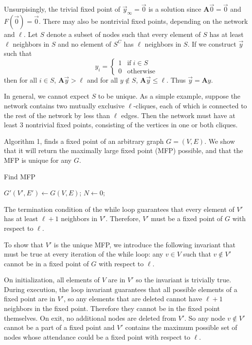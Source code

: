 \documentclass[12pt]{article}
\begin{document}
Unsurpisingly, the trivial fixed point of $\vec{y}_{\infty} = \vec{0}$ is a solution since $\mathbf{A}\vec{0} = \vec{0}$ and $F(\vec{0}) = \vec{0}$.  There may also be nontrivial fixed points, depending on the network and $\ell$.  Let $S$ denote a subset of nodes such that every element of $S$ has at least $\ell$ neighbors in $S$ and no element of $S^C$ has $\ell$ neighbors in $S$.  If we construct $\vec{y}$ such that  
\begin{equation}
  y_i = \begin{cases}
    1 &\text{if} \; i \in S \\
    0 &\text{otherwise}
  \end{cases}
\end{equation}
 then for all $i \in S$, $\mathbf{A}\vec{y} > \ell$ and for all $y \notin S$, $\mathbf{A}\vec{y} \leq \ell$.  Thus $\vec{y} = \mathbf{A}y$. 

In general, we cannot expect $S$ to be unique.  As a simple example, suppose the network contains two mutually exclusive $\ell$-cliques, each of which is connected to the rest of the network by less than $\ell$ edges.  Then the network must have at least 3 nontrivial fixed points, consisting of the vertices in one or both cliques.

Algorithm 1, finds a fixed point of an arbitrary graph $G=(V,E)$.  We show that it will return the maximally large fixed point (MFP) possible, and that the MFP is unique for any $G$.

\begin{algorithm}
  \caption{Find MFP}\label{alg:two}
  $G'(V', E') \gets G(V, E)$;
  $N \gets 0$;
  \end{algorithm}

  The termination condition of the while loop guarantees that every element of $V'$ has at least $\ell + 1$ neighbors in $V'$.  Therefore, $V'$ must be a fixed point of $G$ with respect to $\ell$.  
  
  To show that $V'$ is the unique MFP, we introduce the following invariant that must be true at every iteration of the while loop: any $v \in V$ such that $v \notin V'$ cannot be in a fixed point of $G$ with respect to $\ell$.

  On initialization, all elements of $V$ are in $V'$ so the invariant is trivially true.  During execution, the loop invariant guarantees that all possible elements of a fixed point are in $V'$, so any elements that are deleted cannot have $\ell + 1$ neighbors in the fixed point.  Therefore they cannot be in the fixed point themselves.  On exit, no additional nodes are deleted from $V'$.  So any node $v \notin V'$ cannot be a part of a fixed point and $V'$ contains the maximum possible set of nodes whose attendance could be a fixed point with respect to $\ell$. 
\end{document}
